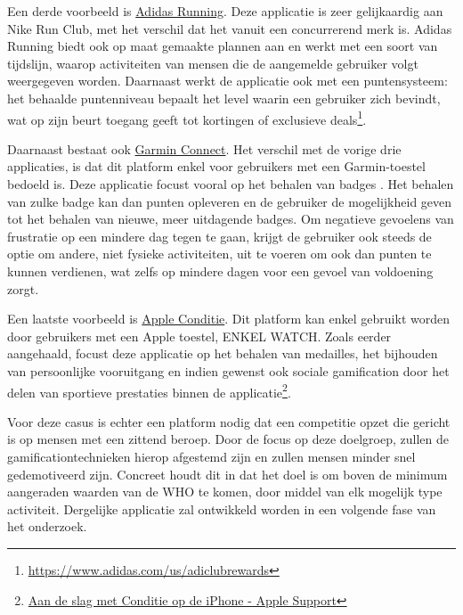 Een derde voorbeeld is \href{https://www.runtastic.com/}{Adidas Running}. Deze applicatie is zeer gelijkaardig aan Nike Run Club, met het verschil dat het vanuit een concurrerend merk is. Adidas Running biedt ook op maat gemaakte plannen aan en werkt met een soort van tijdslijn, waarop activiteiten van mensen die de aangemelde gebruiker volgt weergegeven worden. Daarnaast werkt de applicatie ook met een puntensysteem: het behaalde puntenniveau bepaalt het level waarin een gebruiker zich bevindt, wat op zijn beurt toegang geeft tot kortingen of exclusieve deals\footnote{\href{https://www.adidas.com/us/adiclubrewards}{https://www.adidas.com/us/adiclubrewards}}.

Daarnaast bestaat ook \href{https://connect.garmin.com/}{Garmin Connect}. Het verschil met de vorige drie applicaties, is dat dit platform enkel voor gebruikers met een Garmin-toestel bedoeld is. Deze applicatie focust vooral op het behalen van badges \autocite{Ilhan2019}. Het behalen van zulke badge kan dan punten opleveren en de gebruiker de mogelijkheid geven tot het behalen van nieuwe, meer uitdagende badges. Om negatieve gevoelens van frustratie op een mindere dag tegen te gaan, krijgt de gebruiker ook steeds de optie om andere, niet fysieke activiteiten, uit te voeren om ook dan punten te kunnen verdienen, wat zelfs op mindere dagen voor een gevoel van voldoening zorgt.

Een laatste voorbeeld is \href{https://support.apple.com/nl-be/guide/iphone/ipha5dddb411/ios}{Apple Conditie}. Dit platform kan enkel gebruikt worden door gebruikers met een Apple toestel, ENKEL WATCH. Zoals eerder aangehaald, focust deze applicatie op het behalen van medailles, het bijhouden van persoonlijke vooruitgang en indien gewenst ook sociale gamification door het delen van sportieve prestaties binnen de applicatie\footnote{\href{https://support.apple.com/nl-be/guide/iphone/ipha5dddb411/ios}{Aan de slag met Conditie op de iPhone - Apple Support}}.

Voor deze casus is echter een platform nodig dat een competitie opzet die gericht is op mensen met een zittend beroep. Door de focus op deze doelgroep, zullen de gamificationtechnieken hierop afgestemd zijn en zullen mensen minder snel gedemotiveerd zijn. Concreet houdt dit in dat het doel is om boven de minimum aangeraden waarden van de WHO te komen, door middel van elk mogelijk type activiteit. Dergelijke applicatie zal ontwikkeld worden in een volgende fase van het onderzoek.
